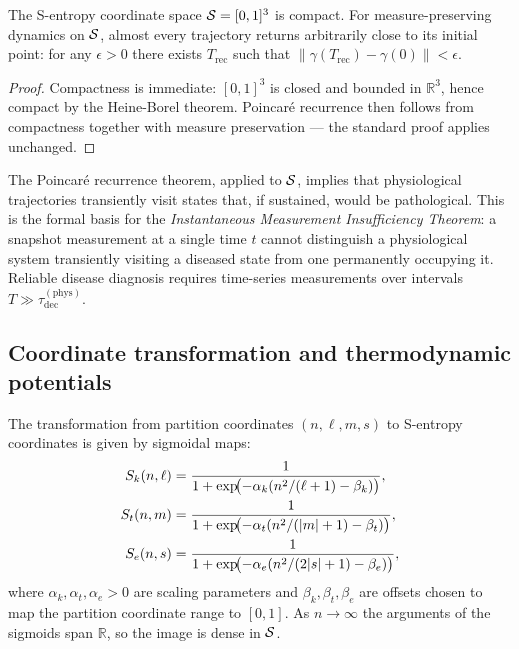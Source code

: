 \begin{theorem}
\label{thm:ch07-compactness}
The S-entropy coordinate space $\mathcal{S} = [0,1]^3$ is compact.  For
measure-preserving dynamics on $\mathcal{S}$, almost every trajectory returns
arbitrarily close to its initial point: for any $\epsilon > 0$ there exists
$T_{\mathrm{rec}}$ such that $\|\gamma(T_{\mathrm{rec}}) - \gamma(0)\| < \epsilon$.
\end{theorem}

\begin{proof}
Compactness is immediate: $[0,1]^3$ is closed and bounded in $\mathbb{R}^3$,
hence compact by the Heine-Borel theorem.  Poincaré recurrence then follows
from compactness together with measure preservation — the standard proof
applies unchanged.
\end{proof}

\begin{remark}
The Poincaré recurrence theorem, applied to $\mathcal{S}$, implies that
physiological trajectories transiently visit states that, if sustained, would
be pathological.  This is the formal basis for the \emph{Instantaneous
Measurement Insufficiency Theorem}: a snapshot measurement at a single time
$t$ cannot distinguish a physiological system transiently visiting a diseased
state from one permanently occupying it.  Reliable disease diagnosis requires
time-series measurements over intervals $T \gg \tau_{\mathrm{dec}}^{(\mathrm{phys})}$.
\end{remark}

\subsection{Coordinate transformation and thermodynamic potentials}

The transformation from partition coordinates $(n,\ell,m,s)$ to S-entropy
coordinates is given by sigmoidal maps:
\begin{align}
  S_k(n,\ell)
  &= \frac{1}{1 + \exp\!\bigl(-\alpha_k(n^2/(\ell+1) - \beta_k)\bigr)},
  \label{eq:ch07-Sk-map} \\
  S_t(n,m)
  &= \frac{1}{1 + \exp\!\bigl(-\alpha_t(n^2/(|m|+1) - \beta_t)\bigr)},
  \label{eq:ch07-St-map} \\
  S_e(n,s)
  &= \frac{1}{1 + \exp\!\bigl(-\alpha_e(n^2/(2|s|+1) - \beta_e)\bigr)},
  \label{eq:ch07-Se-map}
\end{align}
where $\alpha_k,\alpha_t,\alpha_e > 0$ are scaling parameters and
$\beta_k,\beta_t,\beta_e$ are offsets chosen to map the partition coordinate
range to $[0,1]$.  As $n\to\infty$ the arguments of the sigmoids span
$\mathbb{R}$, so the image is dense in $\mathcal{S}$.

